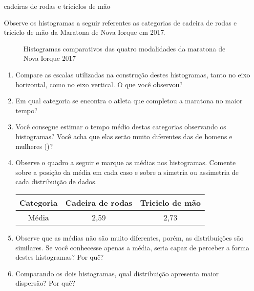 \begin{task}{cadeiras de rodas e triciclos de mão}

Observe os histogramas a seguir referentes as categorias de cadeira de rodas e triciclo de mão da Maratona de Nova Iorque em 2017.

\begin{figure}[H]
\centering
\capstart

\noindent{}
\caption{Histogramas comparativos das quatro modalidades da maratona de Nova Iorque 2017}\label{\detokenize{PE104-2:id1}}\label{\detokenize{PE104-2:id7}}\end{figure}
\begin{enumerate}
\item {} 
Compare as escalas utilizadas na construção destes histogramas, tanto no eixo horizontal, como no eixo vertical. O que você observou?

\item {} 
Em qual categoria se encontra o atleta que completou a maratona no maior tempo?

\item {} 
Você consegue estimar o tempo médio destas categorias observando os histogramas? Você acha que elas serão muito diferentes das de homens e mulheres ()?

\item {} 
Observe o quadro a seguir e marque as médias nos histogramas. Comente sobre a posição da média em cada caso e sobre a simetria ou assimetria de cada distribuição de dados.

\begin{savenotes}\sphinxattablestart
\centering
{}
\label{\detokenize{PE104-2:id8}}
\sphinxaftercaption
\begin{tabulary}{\linewidth}[t]{|c|c|c|}
\hline

Categoria
&
Cadeira de rodas
&
Triciclo de mão
\\
\hline
Média
&
2,59
&
2,73
\\
\hline
\end{tabulary}
\par
\sphinxattableend\end{savenotes}

\item {} 
Observe que as médias não são muito diferentes, porém, as distribuições são similares. Se você conhecesse apenas a média, seria capaz de perceber a forma destes histogramas? Por quê?

\item {} 
Comparando os dois histogramas, qual distribuição apresenta maior dispersão? Por quê?

\end{enumerate}
\end{task}





